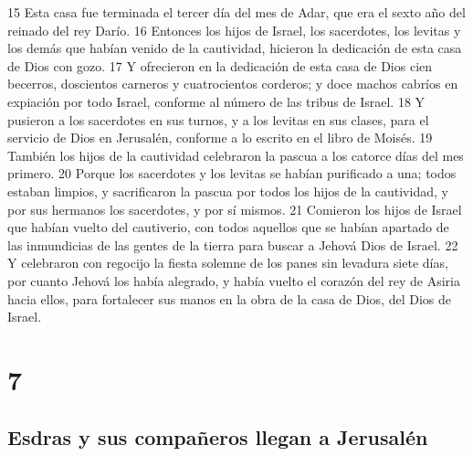 15 Esta casa fue terminada el tercer día del mes de Adar, que era el sexto año del reinado del rey Darío.
16 Entonces los hijos de Israel, los sacerdotes, los levitas y los demás que habían venido de la cautividad, hicieron la dedicación de esta casa de Dios con gozo.
17 Y ofrecieron en la dedicación de esta casa de Dios cien becerros, doscientos carneros y cuatrocientos corderos; y doce machos cabríos en expiación por todo Israel, conforme al número de las tribus de Israel.
18 Y pusieron a los sacerdotes en sus turnos, y a los levitas en sus clases, para el servicio de Dios en Jerusalén, conforme a lo escrito en el libro de Moisés.
19 También los hijos de la cautividad celebraron la pascua a los catorce días del mes primero. 
20 Porque los sacerdotes y los levitas se habían purificado a una; todos estaban limpios, y sacrificaron la pascua por todos los hijos de la cautividad, y por sus hermanos los sacerdotes, y por sí mismos.
21 Comieron los hijos de Israel que habían vuelto del cautiverio, con todos aquellos que se habían apartado de las inmundicias de las gentes de la tierra para buscar a Jehová Dios de Israel.
22 Y celebraron con regocijo la fiesta solemne de los panes sin levadura siete días, por cuanto Jehová los había alegrado, y había vuelto el corazón del rey de Asiria hacia ellos, para fortalecer sus manos en la obra de la casa de Dios, del Dios de Israel.

\chapter{7}

\section*{Esdras y sus compañeros llegan a Jerusalén}


